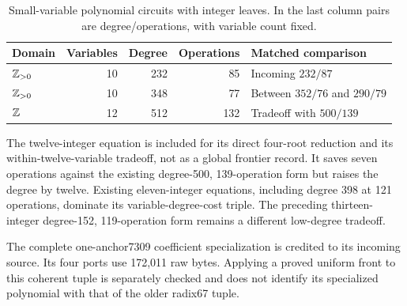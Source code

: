 \begin{table}[ht]
\centering\small
\begin{tabular}{lrrrl}
\toprule
Domain & Variables & Degree & Operations & Matched comparison\\
\midrule
$\mathbb Z_{>0}$ &10&232&85&Incoming $232/87$\\
$\mathbb Z_{>0}$ &10&348&77&Between $352/76$ and $290/79$\\
$\mathbb Z$ &12&512&132&Tradeoff with $500/139$\\
\bottomrule
\end{tabular}
\caption{Small-variable polynomial circuits with integer leaves. In the last
column pairs are degree/operations, with variable count fixed.}
\end{table}
The twelve-integer equation is included for its direct four-root reduction
and its within-twelve-variable tradeoff, not as a global frontier record.
It saves seven operations against the existing degree-500, 139-operation
form but raises the degree by twelve. Existing eleven-integer equations,
including degree 398 at 121 operations, dominate its variable-degree-cost
triple. The preceding thirteen-integer degree-152, 119-operation form remains
a different low-degree tradeoff.

The complete one-anchor7309 coefficient specialization is credited to its
incoming source. Its four ports use 172,011 raw bytes. Applying a proved
uniform front to this coherent tuple is separately checked and does not
identify its specialized polynomial with that of the older radix67 tuple.
